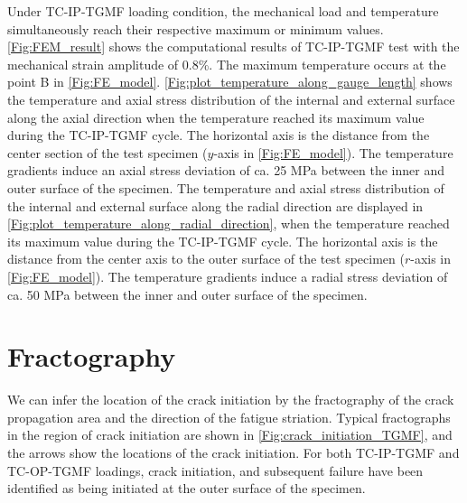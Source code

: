 Under TC-IP-TGMF loading condition, the mechanical load and temperature simultaneously reach their respective maximum or minimum values. \ref{Fig:FEM_result} shows the computational results of TC-IP-TGMF test with the mechanical strain amplitude of 0.8\%. The maximum temperature occurs at the point B in \ref{Fig:FE_model}.
\ref{Fig:plot_temperature_along_gauge_length} shows the temperature and axial stress distribution of the internal and external surface along the axial direction when the temperature reached its maximum value during the TC-IP-TGMF cycle.
The horizontal axis is the distance from the center section of the test specimen ($y$-axis in \ref{Fig:FE_model}). The temperature gradients induce an axial stress deviation of ca. 25 MPa between the inner and outer surface of the specimen.
The temperature and axial stress distribution of the internal and external surface along the radial direction are displayed in \ref{Fig:plot_temperature_along_radial_direction}, when the temperature reached its maximum value during the TC-IP-TGMF cycle.
The horizontal axis is the distance from the center axis to the outer surface of the test specimen ($r$-axis in \ref{Fig:FE_model}).
The temperature gradients induce a radial stress deviation of ca. 50 MPa between the inner and outer surface of the specimen.




\section{Fractography}
\noindent
We can infer the location of the crack initiation by the fractography of the crack propagation area and the direction of the fatigue striation.
Typical fractographs in the region of crack initiation are shown in \ref{Fig:crack_initiation_TGMF}, and the arrows show the locations of the crack initiation. For both TC-IP-TGMF and TC-OP-TGMF loadings, crack initiation, and subsequent failure have been identified as being initiated at the outer surface of the specimen.


